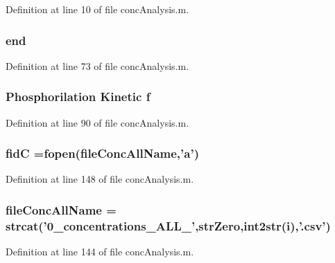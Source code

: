 Definition at line 10 of file conc\-Analysis.\-m.

\hypertarget{a00025_afb358f48b1646c750fb9da6c6585be2b}{
\subsubsection[{end}]{\setlength{\rightskip}{0pt plus 5cm}end}}\label{a00025_afb358f48b1646c750fb9da6c6585be2b}


Definition at line 73 of file conc\-Analysis.\-m.

\hypertarget{a00025_a9c5a71c46b1abb8b7df5ebeac6c81535}{
\subsubsection[{f}]{\setlength{\rightskip}{0pt plus 5cm}Phosphorilation Kinetic f}}\label{a00025_a9c5a71c46b1abb8b7df5ebeac6c81535}


Definition at line 90 of file conc\-Analysis.\-m.

\hypertarget{a00025_a5650dbe23ad9065391c1ea56f8acd34c}{
\subsubsection[{fid\-C}]{\setlength{\rightskip}{0pt plus 5cm}fid\-C =fopen({\bf file\-Conc\-All\-Name},'{\bf a}')}}\label{a00025_a5650dbe23ad9065391c1ea56f8acd34c}


Definition at line 148 of file conc\-Analysis.\-m.

\hypertarget{a00025_a45b397c4e1bd8e68da97ba6d26fbb41f}{
\subsubsection[{file\-Conc\-All\-Name}]{\setlength{\rightskip}{0pt plus 5cm}file\-Conc\-All\-Name = strcat('0\-\_\-concentrations\-\_\-\-A\-L\-L\-\_\-',str\-Zero,int2str(i),'.\-csv')}}\label{a00025_a45b397c4e1bd8e68da97ba6d26fbb41f}


Definition at line 144 of file conc\-Analysis.\-m.


